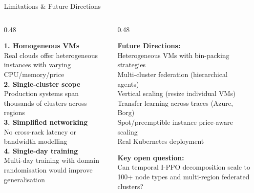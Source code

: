 \documentclass[aspectratio=169,10pt]{beamer}
\begin{document}
\begin{frame}{Limitations \& Future Directions}
\begin{columns}[T]
\begin{column}{0.48\textwidth}
\begin{tcolorbox}[mybox, title={Current Limitations}]
\small
\textbf{1. Homogeneous VMs}\\
\footnotesize Real clouds offer heterogeneous instances with varying CPU/memory/price\\[4pt]
\small \textbf{2. Single-cluster scope}\\
\footnotesize Production systems span thousands of clusters across regions\\[4pt]
\small \textbf{3. Simplified networking}\\
\footnotesize No cross-rack latency or bandwidth modelling\\[4pt]
\small \textbf{4. Single-day training}\\
\footnotesize Multi-day training with domain randomisation would improve generalisation
\end{tcolorbox}
\end{column}
\begin{column}{0.48\textwidth}
\vspace{0.0cm}
\begin{tcolorbox}[accentbox]
\small \textbf{Future Directions:}\\[3pt]
\footnotesize
\textbullet{} Heterogeneous VMs with bin-packing strategies\\[2pt]
\textbullet{} Multi-cluster federation (hierarchical agents)\\[2pt]
\textbullet{} Vertical scaling (resize individual VMs)\\[2pt]
\textbullet{} Transfer learning across traces (Azure, Borg)\\[2pt]
\textbullet{} Spot/preemptible instance price-aware scaling\\[2pt]
\textbullet{} Real Kubernetes deployment
\end{tcolorbox}
\vspace{0.15cm}
\begin{tcolorbox}[warnbox]
\small \textbf{Key open question:}\\
\footnotesize Can temporal I-PPO decomposition scale to 100+ node types and multi-region federated clusters?
\end{tcolorbox}
\end{column}
\end{columns}
\end{frame}
\end{document}
